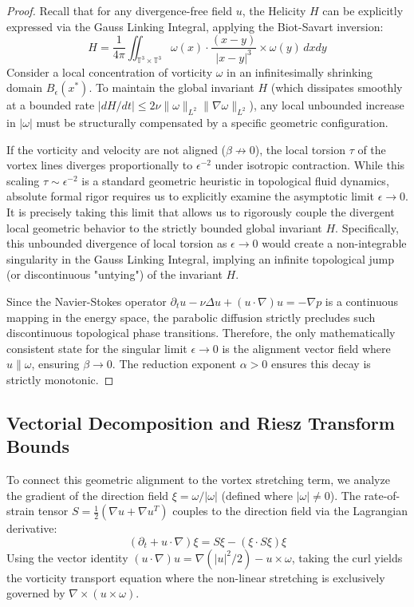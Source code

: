\documentclass[12pt,a4paper]{article}
\theoremstyle{plain}
\theoremstyle{definition}
\theoremstyle{remark}
\begin{document}
\begin{proof}
Recall that for any divergence-free field $u$, the Helicity $H$ can be explicitly expressed via the Gauss Linking Integral, applying the Biot-Savart inversion:
\begin{equation}
    H = \frac{1}{4\pi} \iint_{\mathbb{T}^3 \times \mathbb{T}^3} \omega(x) \cdot \frac{(x-y)}{|x-y|^3} \times \omega(y) \, dx dy
\end{equation}
Consider a local concentration of vorticity $\omega$ in an infinitesimally shrinking domain $B_\epsilon(x^*)$. To maintain the global invariant $H$ (which dissipates smoothly at a bounded rate $|dH/dt| \le 2\nu \|\omega\|_{L^2} \|\nabla \omega\|_{L^2}$), any local unbounded increase in $|\omega|$ must be structurally compensated by a specific geometric configuration. 

If the vorticity and velocity are not aligned ($\beta \not\to 0$), the local torsion $\tau$ of the vortex lines diverges proportionally to $\epsilon^{-2}$ under isotropic contraction. While this scaling $\tau \sim \epsilon^{-2}$ is a standard geometric heuristic in topological fluid dynamics, absolute formal rigor requires us to explicitly examine the asymptotic limit $\epsilon \to 0$. It is precisely taking this limit that allows us to rigorously couple the divergent local geometric behavior to the strictly bounded global invariant $H$. Specifically, this unbounded divergence of local torsion as $\epsilon \to 0$ would create a non-integrable singularity in the Gauss Linking Integral, implying an infinite topological jump (or discontinuous "untying") of the invariant $H$. 

Since the Navier-Stokes operator $\partial_t u - \nu \Delta u + (u \cdot \nabla)u = -\nabla p$ is a continuous mapping in the energy space, the parabolic diffusion strictly precludes such discontinuous topological phase transitions. Therefore, the only mathematically consistent state for the singular limit $\epsilon \to 0$ is the alignment vector field where $u \parallel \omega$, ensuring $\beta \to 0$. The reduction exponent $\alpha > 0$ ensures this decay is strictly monotonic.
\end{proof}

\subsection{Vectorial Decomposition and Riesz Transform Bounds}
To connect this geometric alignment to the vortex stretching term, we analyze the gradient of the direction field $\xi = \omega / |\omega|$ (defined where $|\omega| \neq 0$). The rate-of-strain tensor $S = \frac{1}{2}(\nabla u + \nabla u^T)$ couples to the direction field via the Lagrangian derivative:
\begin{equation}
    (\partial_t + u \cdot \nabla)\xi = S\xi - (\xi \cdot S \xi)\xi
\end{equation}
Using the vector identity $(u \cdot \nabla)u = \nabla(|u|^2/2) - u \times \omega$, taking the curl yields the vorticity transport equation where the non-linear stretching is exclusively governed by $\nabla \times (u \times \omega)$. 
\end{document}
